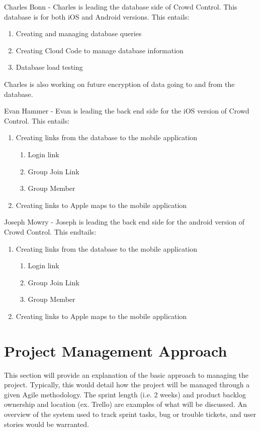 Charles Bonn - Charles is leading the database side of Crowd Control. This database is for both iOS and Android versions. This entails:
	\begin{enumerate}
	\item Creating and managing database queries 
	\item Creating Cloud Code to manage database information
	\item Database load testing
	\end{enumerate}
Charles is also working on future encryption of data going to and from the database.
\newline

Evan Hammer - Evan is leading the back end side for the iOS version of Crowd Control. This entails:
	\begin{enumerate}
	\item Creating links from the database to the mobile application
		\begin{enumerate}
		\item Login link
		\item Group Join Link
		\item Group Member
		\end{enumerate}
	\item Creating links to Apple maps to the mobile application
	\end{enumerate}

Joseph Mowry - Joseph is leading the back end side for the android version of Crowd Control. This endtails:

	\begin{enumerate}
	\item Creating links from the database to the mobile application
		\begin{enumerate}
		\item Login link
		\item Group Join Link
		\item Group Member
		\end{enumerate}
	\item Creating links to Apple maps to the mobile application
	\end{enumerate}



\section{Project  Management Approach}
This section will provide an explanation of the basic approach to managing the 
project.  Typically, this would detail how the project will be managed through 
a given Agile methodology.  The sprint length (i.e. 2 weeks) and product backlog 
ownership and location (ex. Trello) are examples of what will be discussed.  An 
overview of the system used to track sprint tasks, bug or trouble tickets, and 
user stories would be warranted. 

